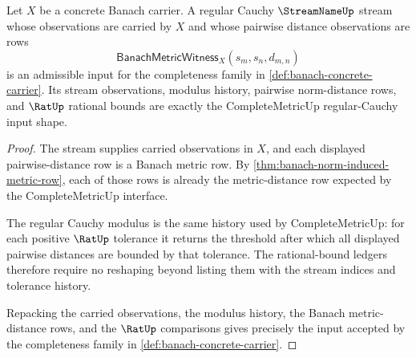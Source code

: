 \begin{theorem}
\label{thm:banach-regular-cauchy-stream-input}
Let $X$ be a concrete Banach carrier. A regular Cauchy $\StreamNameUp$ stream
whose observations are carried by $X$ and whose pairwise distance observations
are rows
$$
\mathsf{BanachMetricWitness}_X(s_m,s_n,d_{m,n})
$$
is an admissible input for the completeness family in
\autoref{def:banach-concrete-carrier}. Its stream observations, modulus
history, pairwise norm-distance rows, and $\RatUp$ rational bounds are exactly
the CompleteMetricUp regular-Cauchy input shape.
\end{theorem}
\begin{proof}
The stream supplies carried observations in $X$, and each displayed
pairwise-distance row is a Banach metric row. By
\autoref{thm:banach-norm-induced-metric-row}, each of those rows is already the
metric-distance row expected by the CompleteMetricUp interface.

The regular Cauchy modulus is the same history used by CompleteMetricUp: for
each positive $\RatUp$ tolerance it returns the threshold after which all
displayed pairwise distances are bounded by that tolerance. The rational-bound
ledgers therefore require no reshaping beyond listing them with the stream
indices and tolerance history.

Repacking the carried observations, the modulus history, the Banach
metric-distance rows, and the $\RatUp$ comparisons gives precisely the input
accepted by the completeness family in \autoref{def:banach-concrete-carrier}.
\end{proof}

